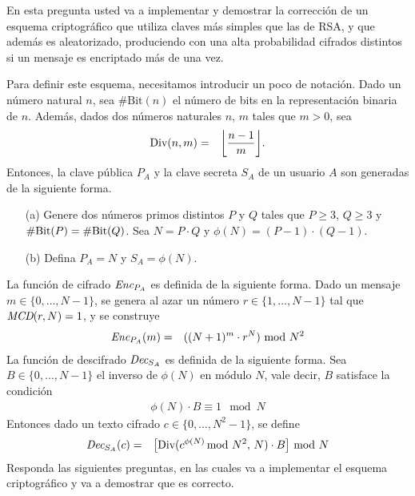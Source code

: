
En esta pregunta usted va a implementar y demostrar la corrección de un
esquema criptográfico que utiliza claves más simples que las de RSA, y
que además es aleatorizado, produciendo con una alta probabilidad cifrados distintos si un
mensaje es encriptado más de una vez.

Para definir este esquema, necesitamos introducir un poco de
notación. Dado un número natural $n$, sea $\#\text{Bit}(n)$ el número
de bits en la representación binaria de $n$. Además, dados dos números
naturales $n$, $m$ tales que $m > 0$, sea
  \begin{eqnarray*}
\text{Div}(n,m) &=& \bigg\lfloor \frac{n-1}{m} \bigg\rfloor.
  \end{eqnarray*}
Entonces, la clave pública $P_A$ y la clave
secreta $S_A$ de un usuario $A$ son generadas de la siguiente forma.
\begin{enumerate}
\item[(a)] Genere dos números primos distintos $P$ y $Q$ tales que $P \geq
  3$, $Q \geq 3$ y $\#\text{Bit}(P) = \#\text{Bit}(Q)$.  Sea $N = P \cdot Q$ y
  $\phi(N) = (P-1) \cdot (Q-1)$.

\item[(b)] Defina $P_A = N$ y $S_A = \phi(N)$.
\end{enumerate}
La función de cifrado $\textit{Enc}_{P_A}$ es definida de la siguiente
forma. Dado un mensaje $m \in \{0, \ldots, N-1\}$, se genera al azar un número $r
\in \{1, \ldots, N-1\}$ tal que $\textit{MCD}(r, N) = 1$, y se construye
  \begin{eqnarray*}
    \textit{Enc}_{P_A}(m) &=& ((N+1)^m \cdot r^N) \!\! \mod N^2
  \end{eqnarray*}
La función de descifrado $\textit{Dec}_{S_A}$ es definida de la siguiente
forma. Sea $B \in \{0, \ldots, N-1\}$ el inverso de $\phi(N)$ en módulo
$N$, vale decir, $B$ satisface la condición
\begin{eqnarray*}
  \phi(N) \cdot B \equiv 1  \mod N
\end{eqnarray*}
Entonces dado un texto cifrado $c \in \{0, \ldots, N^2-1\}$, se define 
  \begin{eqnarray*}
    \textit{Dec}_{S_A}(c) &=&   \big[\text{Div}(c^{\phi(N)} \!\!\!\mod N^2,\, N)  \cdot B \big] \!\!\mod N
  \end{eqnarray*}
  Responda las siguientes preguntas, en las cuales va a implementar el esquema criptográfico y va a demostrar que es correcto.
